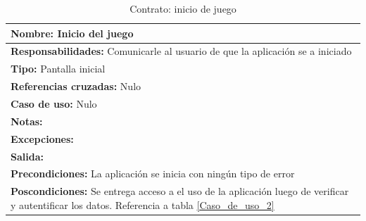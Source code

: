 \begin{table}[H]
    \begin{center}
        \begin{tabular}{| m{15cm} |}       
        	\hline 
        	\textbf{Nombre:} Inicio del juego \\
        	\hline
        	\textbf{Responsabilidades:} Comunicarle al usuario de que la aplicación se a iniciado\\
        	\hline
        	\textbf{Tipo:} Pantalla inicial \\
        	\hline
        	\textbf{Referencias cruzadas:} Nulo\\
        	\hline
        	\textbf{Caso de uso:} Nulo\\
        	\hline
        	\textbf{Notas:} \\
        	\hline
        	\textbf{Excepciones:} \\
        	\hline
        	\textbf{Salida:} \\
        	\hline
        	\textbf{Precondiciones:} La aplicación se inicia con ningún tipo de error\\
        	\hline
        	\textbf{Poscondiciones:} Se entrega acceso a el uso de la aplicación luego de verificar y autentificar los datos. Referencia a tabla \ref{Caso_de_uso_2}\\
        	\hline
        \end{tabular}
	\caption{Contrato: inicio de juego}
    \label{Contrato1}
    \end{center}
\end{table}

